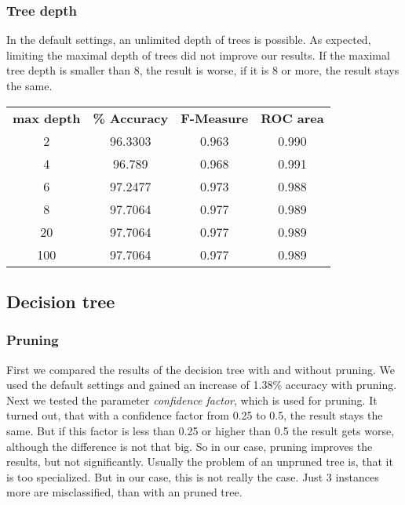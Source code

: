 \documentclass{article}
\begin{document}
\subsubsection{Tree depth}
 
In the default settings, an unlimited depth of trees is possible. As expected, limiting the maximal depth of trees did not improve our results. If the maximal tree depth is smaller than 8, the result is worse, if it is 8 or more, the result stays the same.
 
\begin{center}
\begin{tabular}{ c | c | c | c }
\textbf{max depth} & \textbf{\% Accuracy} & \textbf{F-Measure} & \textbf{ROC area} \\
2 & 96.3303 & 0.963 & 0.990 \\
4 & 96.789 & 0.968 & 0.991 \\
6 & 97.2477 & 0.973 & 0.988 \\
8 & 97.7064 & 0.977 & 0.989 \\
20 & 97.7064 & 0.977 & 0.989 \\
100 & 97.7064 & 0.977 & 0.989 \\
\end{tabular}
\end{center}
 
\subsection{Decision tree}
 
\subsubsection{Pruning}
 
First we compared the results of the decision tree with and without pruning. We used the default settings and gained an increase of 1.38\% accuracy with pruning. Next we tested the parameter \emph{confidence factor}, which is used for pruning. It turned out, that with a confidence factor from 0.25 to 0.5, the result stays the same. But if this factor is less than 0.25 or higher than 0.5 the result gets worse, although the difference is not that big. So in our case, pruning improves the results, but not significantly. Usually the problem of an unpruned tree is, that it is too specialized. But in our case, this is not really the case. Just 3 instances more are misclassified, than with an pruned tree. 
 
\end{document}

